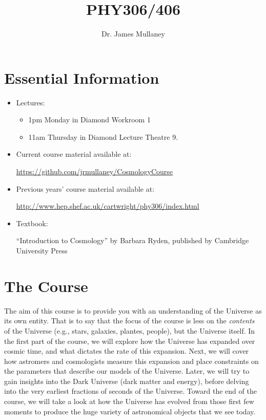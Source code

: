 \documentclass[11pt]{article}
\begin{document}
     
    \title{PHY306/406}
    \author{Dr. James Mullaney}
    \maketitle
    
    \section{Essential Information}
    \begin{itemize}
    
    \item Lectures:
    \begin{itemize}
        \item 1pm Monday in Diamond Workroom 1
        \item 11am Thursday in Diamond Lecture Theatre 9.
    \end{itemize}

    \item Current course material available at:

    \noindent
    \url{https://github.com/jrmullaney/CosmologyCourse}

    \item Previous years' course material available at:

    \noindent
    \url{http://www.hep.shef.ac.uk/cartwright/phy306/index.html}

    \item Textbook:
    
    \noindent
    ``Introduction to Cosmology'' by Barbara Ryden, published by Cambridge University Press
\end{itemize}

    \section{The Course}
    The aim of this course is to provide you with an understanding of the Universe as its own entity. That is to say that the focus of the course is less on the {\it contents} of the Universe (e.g., stars, galaxies, plantes, people), but the Universe itself. In the first part of the course, we will explore how the Universe has expanded over cosmic time, and what dictates the rate of this expansion. Next, we will cover how astromers and cosmologists measure this expansion and place constraints on the parameters that describe our models of the Universe. Later, we will try to gain insights into the Dark Universe (dark matter and energy), before delving into the very earliest fractions of seconds of the Universe. Toward the end of the course, we will take a look at how the Universe has evolved from those first few moments to produce the huge variety of astronomical objects that we see today. 
    
\end{document}
